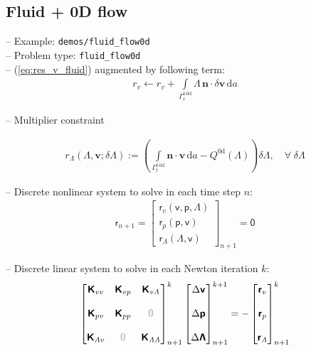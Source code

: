\documentclass[a4paper,12pt]{report}
\newcommand{\fF}{\text{f}}
\newcommand{\bs}[1]{\boldsymbol{#1}}
\newcommand{\Gm}{\mathit{\Gamma}}
\newcommand{\zerom}{\textcolor{lightgray}{\bs{\mathsf{0}}}}
\newcommand{\ROP}{\bs{\mathsf{r}}}
\newcommand{\LMZ}{\bs{\mathsf{\Lambda}}}
\newcommand{\lmzi}{\mathit{\Lambda}} %
\begin{document}
\subsection{Fluid + 0D flow}\label{subsec:fluid_flow0d}

-- Example: \verb.demos/fluid_flow0d.\\

-- Problem type: \verb.fluid_flow0d.\\

-- (\ref{eq:res_v_fluid}) augmented by following term:
\begin{align}
r_v \leftarrow r_v + \int\limits_{\Gm_t^{\fF\text{-}\mathrm{0d}}}\!\mathit{\Lambda}\,\bs{n}\cdot\delta\bs{v}\,\mathrm{d}a
\end{align}

-- Multiplier constraint

\begin{align}
r_{\mathit{\Lambda}}(\mathit{\Lambda},\bs{v};\delta\mathit{\Lambda}):= \left(\int\limits_{\Gm_t^{\mathrm{\fF\text{-}0d}}}\! \bs{n}\cdot\bs{v}\,\mathrm{d}a - Q^{\mathrm{0d}}(\mathit{\Lambda})\right) \delta\mathit{\Lambda}, \quad \forall \; \delta\mathit{\Lambda}
\end{align}

-- Discrete nonlinear system to solve in each time step $n$:
\begin{align}
\ROP_{n+1} = \begin{bmatrix} \ROP_{v}(\bs{\mathsf{v}},\bs{\mathsf{p}},\LMZ) \\ \ROP_{p}(\bs{\mathsf{p}},\bs{\mathsf{v}}) \\ \ROP_{\mathit{\Lambda}}(\LMZ,\bs{\mathsf{v}}) \end{bmatrix}_{n+1} = \bs{\mathsf{0}}\label{eq:nonlin_sys_fluid_0d}
\end{align}

-- Discrete linear system to solve in each Newton iteration $k$:
\begin{align}
\begin{bmatrix} \bs{\mathsf{K}}_{vv} & \bs{\mathsf{K}}_{vp} & \bs{\mathsf{K}}_{v\lmzi} \\ \\ \bs{\mathsf{K}}_{pv} & \bs{\mathsf{K}}_{pp} & \zerom \\ \\  \bs{\mathsf{K}}_{\lmzi v} & \zerom & \bs{\mathsf{K}}_{\lmzi\lmzi}\end{bmatrix}_{n+1}^{k}\begin{bmatrix} \Delta\bs{\mathsf{v}} \\ \\ \Delta\bs{\mathsf{p}} \\ \\ \Delta\LMZ \end{bmatrix}_{n+1}^{k+1}=-\begin{bmatrix} \ROP_{v} \\ \\ \ROP_{p} \\ \\ \ROP_{\lmzi}\end{bmatrix}_{n+1}^{k} \label{eq:lin_sys_fluid_0d}
\end{align}
\end{document}
